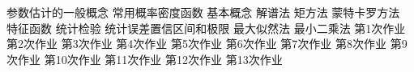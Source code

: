 \documentclass[11pt,a4paper]{ctexart}
\begin{document}
\tableofcontents\clearpage
{}
{参数估计的一般概念}
\clearpage
{常用概率密度函数}
\clearpage
{基本概念}
\clearpage
{解谱法}
\clearpage
{矩方法}
\clearpage
{蒙特卡罗方法}
\clearpage
{特征函数}
\clearpage
{统计检验}
\clearpage
{统计误差置信区间和极限}
\clearpage
{最大似然法}
\clearpage
{最小二乘法}
\clearpage
{}
{第1次作业}
\clearpage
{第2次作业}
\clearpage
{第3次作业}
\clearpage
{第4次作业}
\clearpage
{第5次作业}
\clearpage
{第6次作业}
\clearpage
{第7次作业}
\clearpage
{第8次作业}
\clearpage
{第9次作业}
\clearpage
{第10次作业}
\clearpage
{第11次作业}
\clearpage
{第12次作业}
\clearpage
{第13次作业}
\clearpage
\end{document}
